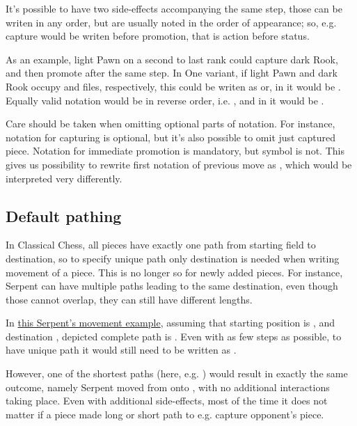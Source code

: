 It's possible to have two side-effects accompanying the same step, those can be
writen in any order, but are usually noted in the order of appearance; so, e.g.
capture would be writen before promotion, that is action before status.

As an example, light Pawn on a second to last rank could capture dark Rook, and
then promote after the same step. In One variant, if light Pawn and dark Rook
occupy  and  files, respectively, this could be writen as
 or, in  it would be . Equally valid
notation would be in reverse order, i.e. , and in  it
would be .

Care should be taken when omitting optional parts of notation. For instance,
notation for capturing is optional, but it's also possible to omit just captured
piece. Notation for immediate promotion is mandatory, but symbol is not. This
gives us possibility to rewrite first notation of previous move as ,
which would be interpreted very differently.

\subsection*{Default pathing}
\label{sec:Appendix/Notation/Default pathing}

In Classical Chess, all pieces have exactly one path from starting field to destination,
so to specify unique path only destination is needed when writing movement of a piece.
This is no longer so for newly added pieces. For instance, Serpent can have multiple paths
leading to the same destination, even though those cannot overlap, they can still have
different lengths.

In \hyperref[fig:scn_tr_05_serpent_end]{this Serpent's movement example}, assuming that
starting position is , and destination , depicted complete path is
. Even with as few steps as possible, to have unique path
it would still need to be written as .

However, one of the shortest paths (here, e.g. \newline
{}) would result in exactly the same outcome, namely Serpent moved from
 onto , with no additional interactions taking place. Even with additional
side-effects, most of the time it does not matter if a piece made long or short path to e.g.
capture opponent's piece.

